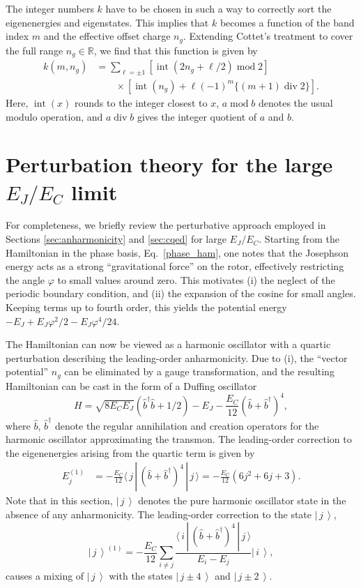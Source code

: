 \documentclass[twocolumn,amsmath,amssymb,floatfix,pra,showpacs,eqsecnum,footinbib,superscriptaddress]{revtex4}
\newcommand{\RR}{\mathbb{R}}
\newcommand{\ket}[1]{\left|\, #1 \, \right\rangle}
\newcommand{\boket}[3]{\langle\, #1 \,|\, #2 \,|\, #3 \,\rangle}
\newcommand{\be}{\begin{equation}}
\newcommand{\ee}{\end{equation}}
\DeclareMathOperator{\divg}{div}
\DeclareMathOperator{\rnd}{int}
\DeclareMathOperator{\mmod}{mod}
\begin{document}
The integer numbers $k$ have to be chosen in such a way to correctly sort the eigenenergies and eigenstates. This implies that $k$ becomes a function of the band index $m$ and the effective offset charge $n_g$. Extending Cottet's treatment \cite{cottet} to cover the full range $n_g\in\RR$, we find that this function is given by
\begin{align}
k(m,n_g)&=\sum_{\ell=\pm1} [\rnd(2n_g+\ell/2) \mmod 2]\\\nonumber
&\qquad\times[\rnd(n_g)+\ell(-1)^m\{ (m+1) \divg 2\}].
\end{align}
Here, $\rnd(x)$ rounds to the integer closest to $x$, $a\mmod b$ denotes the usual modulo operation, and $a \divg b$ gives the integer quotient of $a$ and $b$.

\section{Perturbation theory for the large $E_J/E_C$ limit\label{app:perturb}}
For completeness, we briefly review the perturbative approach employed in Sections \ref{sec:anharmonicity} and \ref{sec:cqed} for large $E_J/E_C$. Starting from the Hamiltonian in the phase basis, Eq.~\eqref{phase_ham}, one notes that the Josephson energy acts as a strong ``gravitational force'' on the rotor, effectively restricting the angle $\varphi$ to small values around zero. This motivates (i) the neglect of the periodic boundary condition, and (ii) the expansion of the cosine for small angles. Keeping terms up to fourth order, this yields the potential energy $-E_J+E_J\varphi^2/2-E_J\varphi^4/24$.

The Hamiltonian can now be viewed as a harmonic oscillator with a quartic perturbation describing the leading-order anharmonicity. Due to (i), the ``vector potential'' $n_g$ can be eliminated by a gauge transformation, and the resulting Hamiltonian can be cast in the form of a Duffing oscillator 
\be
H=\sqrt{8E_CE_J}(\hat{b}^\dag \hat{b} +1/2) - E_J -\frac{E_C}{12}(\hat{b}+\hat{b}^\dag)^4,
\ee
where $\hat{b}$, $\hat{b}^\dag$ denote the regular annihilation and creation operators for the harmonic oscillator approximating the transmon. The leading-order correction to the eigenenergies arising from the quartic term is given by
\begin{align}
E_j^{(1)} &= -\frac{E_C}{12}\boket{j}{(\hat{b}+\hat{b}^\dag)^4}{j}%
           = -\frac{E_C}{12} (6j^2+6j+3).
\end{align}
Note that in this section, $\ket{j}$ denotes the pure harmonic oscillator state in the absence of any anharmonicity.
The leading-order correction to the state $\ket{j}$,
\be
\ket{j}^{(1)} = -\frac{E_C}{12}\sum_{i\not=j} \frac{\boket{i}{(\hat{b}+\hat{b}^\dag)^4}{j}}{E_i-E_j}\ket{i},
\ee
causes a mixing of $\ket{j}$ with the states $\ket{j\pm4}$ and $\ket{j\pm2}$.
\end{document}
